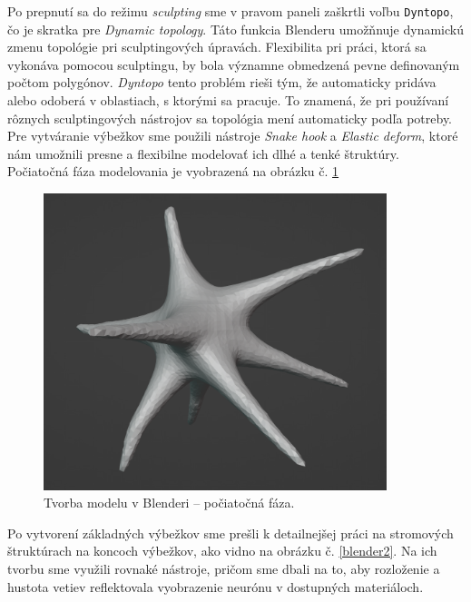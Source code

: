 Po prepnutí sa do režimu \emph{sculpting} sme v pravom paneli zaškrtli voľbu \texttt{Dyntopo}, čo je skratka pre \emph{Dynamic topology}. Táto funkcia Blenderu umožňnuje dynamickú zmenu
topológie pri sculptingových úpravách. Flexibilita pri práci, ktorá sa vykonáva pomocou sculptingu, by bola významne obmedzená pevne definovaným počtom polygónov. \emph{Dyntopo} tento problém
rieši tým, že automaticky pridáva alebo odoberá v oblastiach, s ktorými sa pracuje. To znamená, že pri používaní rôznych sculptingových nástrojov sa topológia mení automaticky podľa potreby.
Pre vytváranie výbežkov sme použili nástroje \emph{Snake hook} a \emph{Elastic deform}, ktoré nám umožnili presne a flexibilne modelovať ich dlhé a tenké štruktúry. Počiatočná fáza modelovania
je vyobrazená na obrázku č. \ref{blender1}

\begin{figure}[!htbp]
  \centering
  \includegraphics[width=10cm]{img/n1-crop.png}
  \caption{Tvorba modelu v Blenderi {--} počiatočná fáza.}
  \label{blender1}
\end{figure}	

Po vytvorení základných výbežkov sme prešli k detailnejšej práci na stromových štruktúrach na koncoch výbežkov, ako vidno na obrázku č. \ref{blender2}. Na ich tvorbu sme využili rovnaké nástroje, 
pričom sme dbali na to, aby rozloženie a hustota vetiev reflektovala vyobrazenie neurónu v dostupných materiáloch. 

